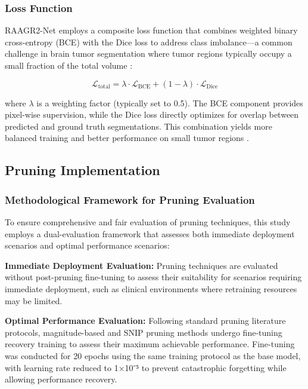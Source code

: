\documentclass[12pt,a4paper]{article}
\begin{document}
\subsubsection{Loss Function}
RAAGR2-Net employs a composite loss function that combines weighted binary cross-entropy (BCE) with the Dice loss to address class imbalance—a common challenge in brain tumor segmentation where tumor regions typically occupy a small fraction of the total volume \cite{Rehman2023RAAGR2}:

\begin{equation}
\mathcal{L}_{\textrm{total}} = \lambda \cdot \mathcal{L}_{\textrm{BCE}} + (1-\lambda) \cdot \mathcal{L}_{\textrm{Dice}}
\end{equation}

where $\lambda$ is a weighting factor (typically set to 0.5). The BCE component provides pixel-wise supervision, while the Dice loss directly optimizes for overlap between predicted and ground truth segmentations. This combination yields more balanced training and better performance on small tumor regions \cite{Rehman2023RAAGR2}.

\subsection{Pruning Implementation}

\subsubsection{Methodological Framework for Pruning Evaluation}

To ensure comprehensive and fair evaluation of pruning techniques, this study employs a dual-evaluation framework that assesses both immediate deployment scenarios and optimal performance scenarios:

\textbf{Immediate Deployment Evaluation:} Pruning techniques are evaluated without post-pruning fine-tuning to assess their suitability for scenarios requiring immediate deployment, such as clinical environments where retraining resources may be limited.

\textbf{Optimal Performance Evaluation:} Following standard pruning literature protocols, magnitude-based and SNIP pruning methods undergo fine-tuning recovery training to assess their maximum achievable performance. Fine-tuning was conducted for 20 epochs using the same training protocol as the base model, with learning rate reduced to 1×10⁻⁵ to prevent catastrophic forgetting while allowing performance recovery.
\end{document}
